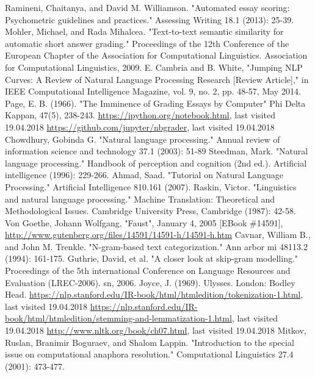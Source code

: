\documentclass[rnd]{mas_report}
\begin{document}
\begin{thebibliography}{3}
 Ramineni, Chaitanya, and David M. Williamson. "Automated essay scoring: Psychometric guidelines and practices." Assessing Writing 18.1 (2013): 25-39. 
 Mohler, Michael, and Rada Mihalcea. "Text-to-text semantic similarity for automatic short answer grading." Proceedings of the 12th Conference of the European Chapter of the Association for Computational Linguistics. Association for Computational Linguistics, 2009.
 E. Cambria and B. White, "Jumping NLP Curves: A Review of Natural Language Processing Research [Review Article]," in IEEE Computational Intelligence Magazine, vol. 9, no. 2, pp. 48-57, May 2014.
  Page, E. B. (1966). "The Imminence of Grading Essays by Computer" Phi Delta Kappan, 47(5), 238-243.
 \url{https://ipython.org/notebook.html}, last visited 19.04.2018
 \url{https://github.com/jupyter/nbgrader}, last visited 19.04.2018
 Chowdhury, Gobinda G. "Natural language processing." Annual review of information science and technology 37.1 (2003): 51-89
 Steedman, Mark. "Natural language processing." Handbook of perception and cognition (2nd ed.). Artificial intelligence (1996): 229-266.
 Ahmad, Saad. "Tutorial on Natural Language Processing." Artificial Intelligence 810.161 (2007).
  Raskin, Victor. "Linguistics and natural language processing." Machine Translation: Theoretical and Methodological Issues. Cambridge University Press, Cambridge (1987): 42-58.
 Von Goethe, Johann Wolfgang, "Faust", January 4, 2005 [EBook \#14591], \url{http://www.gutenberg.org/files/14591/14591-h/14591-h.htm}
 Cavnar, William B., and John M. Trenkle. "N-gram-based text categorization." Ann arbor mi 48113.2 (1994): 161-175.
 Guthrie, David, et al. "A closer look at skip-gram modelling." Proceedings of the 5th international Conference on Language Resources and Evaluation (LREC-2006). sn, 2006.
 Joyce, J. (1969). Ulysses. London: Bodley Head.
 \url{https://nlp.stanford.edu/IR-book/html/htmledition/tokenization-1.html}, last visited 19.04.2018
 \url{https://nlp.stanford.edu/IR-book/html/htmledition/stemming-and-lemmatization-1.html}, last visited 19.04.2018
 \url{http://www.nltk.org/book/ch07.html}, last visited 19.04.2018
 Mitkov, Ruslan, Branimir Boguraev, and Shalom Lappin. "Introduction to the special issue on computational anaphora resolution." Computational Linguistics 27.4 (2001): 473-477.

\end{thebibliography}
\end{document}
